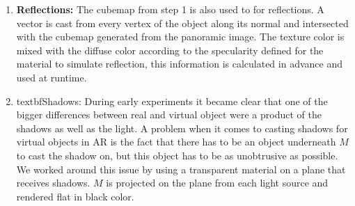 \begin{enumerate}
 \item \textbf{Reflections:} The cubemap from step 1 is also used to for reflections. A vector is cast from every vertex of the object along its normal and intersected with the cubemap generated from the panoramic image. The texture color is mixed with the diffuse color according to the specularity defined for the material to simulate reflection, this information is calculated in advance and used at runtime. 
 
 \item textbf{Shadows:} During early experiments it became clear that one of the bigger differences between real and virtual object were a product of the shadows as well as the light. A problem when it comes to casting shadows for virtual objects in AR is the fact that there has to be an object underneath $M$ to cast the shadow on, but this object has to be as unobtrusive as possible. We worked around this issue by using a transparent material on a plane that receives shadows. $M$ is projected on the plane from each light source and rendered flat in black color.
 
\end{enumerate}